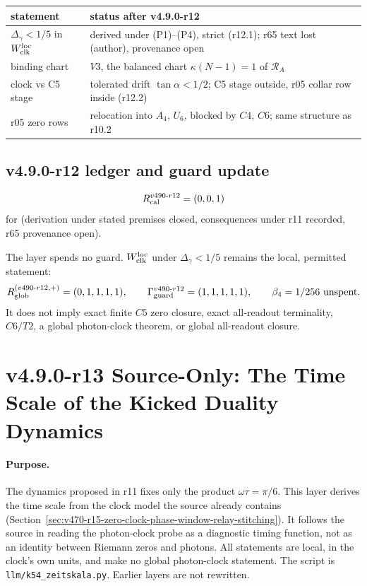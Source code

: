 \begin{center}
\small
\begin{tabular}{@{}>{\raggedright\arraybackslash}p{}>{\raggedright\arraybackslash}p{}@{}}
\toprule
statement & status after v4.9.0-r12\\
\midrule
\(\Delta_\gamma<1/5\) in \(W_{\rm clk}^{\rm loc}\) & derived under (P1)--(P4), strict (r12.1); r65 text lost (author), provenance open\\
binding chart & \(V3\), the balanced chart \(\kappa(N-1)=1\) of \(\mathcal R_A\)\\
clock vs C5 stage & tolerated drift \(\tan\alpha<1/2\); C5 stage outside, r05 collar row inside (r12.2)\\
r05 zero rows & relocation into \(A_4\), \(U_6\), blocked by \(C4\), \(C6\); same structure as r10.2\\
\bottomrule
\end{tabular}
\end{center}

\subsection*{v4.9.0-r12 ledger and guard update}
\label{subsec:v490-r12-ledger-guard}

\[
R_{\rm cal}^{v490\text{-}r12}=(0,0,1)
\]
for (derivation under stated premises closed, consequences under r11 recorded, r65 provenance open).

The layer spends no guard.  \(W_{\rm clk}^{\rm loc}\) under \(\Delta_\gamma<1/5\) remains the local, permitted statement:
\[
R_{\rm glob}^{(v490\text{-}r12,+)}=(0,1,1,1,1),
\qquad
\Gamma_{\rm guard}^{v490\text{-}r12}=(1,1,1,1,1),
\qquad
\beta_4=1/256\ \text{unspent}.
\]
It does not imply exact finite \(C5\) zero closure, exact all-readout terminality,
\(C6/T2\), a global photon-clock theorem, or global all-readout closure.

\clearpage
\section*{v4.9.0-r13 Source-Only: The Time Scale of the Kicked Duality Dynamics}
\label{sec:v490-r13-time-scale}

\paragraph{Purpose.}
The dynamics proposed in r11 fixes only the product \(\omega\tau=\pi/6\).  This layer derives the time scale from the clock
model the source already contains (Section~\ref{sec:v470-r15-zero-clock-phase-window-relay-stitching}).  It follows the
source in reading the photon-clock probe as a diagnostic timing function, not as an identity between Riemann zeros and
photons.  All statements are local, in the clock's own units, and make no global photon-clock statement.  The script is
\texttt{llm/k54\_zeitskala.py}.  Earlier layers are not rewritten.

